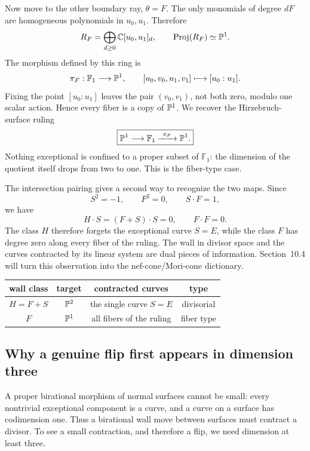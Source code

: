 \begin{example}
Now move to the other boundary ray, \(\theta=F\).  The only monomials of
degree \(dF\) are homogeneous polynomials in \(u_0,u_1\).  Therefore
\[
R_F
=
\bigoplus_{d\geq0}\mathbb{C}[u_0,u_1]_d,
\qquad
\operatorname{Proj}(R_F)\simeq\mathbb{P}^1.
\]
The morphism defined by this ring is
\[
\pi_F:\mathbb F_1\longrightarrow\mathbb{P}^1,
\qquad
[u_0,v_0,u_1,v_1]
\longmapsto
[u_0:u_1].
\]
Fixing the point \([u_0:u_1]\) leaves the pair \((v_0,v_1)\), not both
zero, modulo one scalar action.  Hence every fiber is a copy of
\(\mathbb{P}^1\).  We recover the Hirzebruch-surface ruling
\[
\boxed{
\mathbb{P}^1\longrightarrow\mathbb F_1
\xrightarrow{\ \pi_F\ }\mathbb{P}^1.}
\]
Nothing exceptional is confined to a proper subset of \(\mathbb F_1\):
the dimension of the quotient itself drops from two to one.  This is
the fiber-type case.
\end{example}

The intersection pairing gives a second way to recognize the two
maps.  Since
\[
S^2=-1,
\qquad
F^2=0,
\qquad
S\cdot F=1,
\]
we have
\[
H\cdot S=(F+S)\cdot S=0,
\qquad
F\cdot F=0.
\]
The class \(H\) therefore forgets the exceptional curve \(S=E\), while
the class \(F\) has degree zero along every fiber of the ruling.  The
wall in divisor space and the curves contracted by its linear system
are dual pieces of information.  Section~10.4 will turn this
observation into the nef-cone/Mori-cone dictionary.

\begin{center}
\small
\begin{tabular}{c|c|c|c}
\textbf{wall class}
&\textbf{target}
&\textbf{contracted curves}
&\textbf{type}
\\
\hline
\(H=F+S\)
&\(\mathbb{P}^2\)
&the single curve \(S=E\)
&divisorial
\\
\(F\)
&\(\mathbb{P}^1\)
&all fibers of the ruling
&fiber type
\end{tabular}
\end{center}

\subsection{Why a genuine flip first appears in dimension three}

A proper birational morphism of normal surfaces cannot be small: every
nontrivial exceptional component is a curve, and a curve on a surface
has codimension one.  Thus a birational wall move between surfaces
must contract a divisor.  To see a small contraction, and therefore a
flip, we need dimension at least three.

